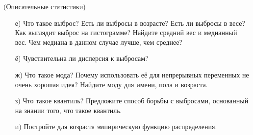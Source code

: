 \documentclass[12pt, a4paper, oneside]{article}
\begin{document}
\begin{problem}{(Описательные статистики)}
\begin{enumerate}
	\item[е)] Что такое выброс? Есть ли выбросы в возрасте? Есть ли выбросы в весе? Как выглядит выброс на гистограмме? Найдите средний вес и медианный вес. Чем медиана в данном случае лучше, чем среднее?
	
	\item[ё)] Чувствительна ли дисперсия к выбросам?
	
	\item[ж)] Что такое мода? Почему использовать её для непрерывных переменных не очень хорошая идея? Найдите моду для имени, пола и возраста.
	
	\item[з)]  Что такое квантиль? Предложите способ  борьбы с выбросами, основанный на знании того, что такое квантиль.
	
	\item[и)] Постройте для возраста эмпирическую функцию распределения.
	
\end{enumerate}
\end{problem}
\end{document}
